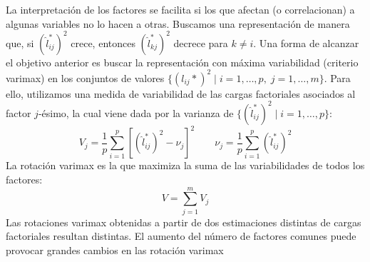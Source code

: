 \documentclass[twoside]{article}
\begin{document}
\begin{enumerate}
\begin{enumerate}
	La interpretación de los factores se facilita si los que afectan (o correlacionan) a algunas variables no lo hacen a otras. Buscamos una representación de manera que, si $(\hat{l}_{ij}^*)^2$ crece, entonces $(\hat{l}_{kj}^*)^2$ decrece para $k\neq i$. Una forma de alcanzar el objetivo anterior es buscar la representación con máxima variabilidad (criterio varimax) en los conjuntos de valores $\{(l_{ij}*)^2 \mid i=1,\dotsc,p,\; j=1,\dotsc, m\}$. Para ello, utilizamos una medida de variabilidad de las cargas factoriales asociados al factor $j$-ésimo, la cual viene dada por la varianza de $\{(\hat{l}_{ij}^*)^2\mid i=1,\dotsc,p\}$:
	$$
	V_j =\frac{1}{p}\sum_{i=1}^p \left[(\hat{l}_{ij}^*)^2-\nu_j\right]^2 \qquad \nu_j = \frac{1}{p}\sum_{i=1}^p (\hat{l}_{ij}^*)^2
	$$
La rotación varimax es la que maximiza la suma de las variabilidades de todos los factores: 
$$
V = \sum_{j=1}^m V_j
$$
Las rotaciones varimax obtenidas a partir de dos estimaciones distintas de  cargas factoriales resultan distintas. El aumento del número de factores comunes puede provocar grandes cambios en las rotación varimax
\end{enumerate}
\end{enumerate}

\newpage
\end{document}
